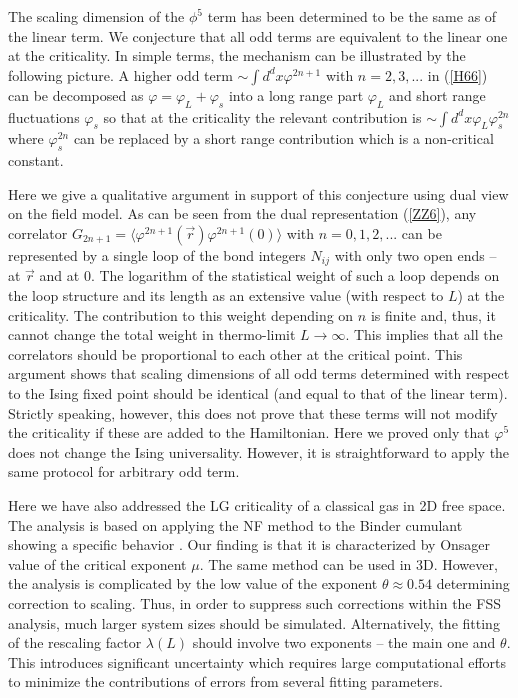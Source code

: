 \documentclass[prb,aps,twocolumn,groupedaddress,floats,showpacs,final]{revtex4}
\begin{document}
 The scaling dimension of the $\phi^5$ term has been determined to be the same as of the linear term. We  
 conjecture that all odd terms are equivalent to the linear one at the criticality.   In simple terms, the mechanism can be illustrated by the following picture. A higher odd term $\sim \int d^dx \varphi^{2n+1}$ with $n=2,3,...$ in (\ref{H66}) can be decomposed as $\varphi=\varphi_L + \varphi_s$  into a long range part $\varphi_L$ and short range fluctuations $\varphi_s$ so that at the criticality the relevant contribution is $\sim \int d^dx \varphi_L \varphi_s^{2n}$ where     $\varphi_s^{2n}$ can be replaced by a short range contribution which is a non-critical constant.  

Here we give a qualitative argument in support of this conjecture using dual view on the field model. As can be seen from the dual representation (\ref{ZZ6}), any correlator $G_{2n+1}=\langle \varphi^{2n+1}(\vec{r}) \varphi^{2n+1}(0) \rangle $ with $n=0,1,2,...$ can be represented by a single loop of the bond integers $N_{ij}$ with only two open ends -- at $\vec{r}$ and at $0$. The logarithm of the statistical weight of such a loop depends on the loop structure and its length as an extensive value (with respect to $L$) at the criticality. The contribution to this weight depending on $n$  is finite and, thus, it cannot change the total weight in thermo-limit $L \to \infty$. This implies that all the correlators should be proportional to each other at the critical point. This argument shows that scaling dimensions of all odd terms determined with respect to the Ising fixed point should be identical (and equal to that of the linear term). Strictly speaking, however, this does not prove that these terms will not modify the criticality if these are added to the Hamiltonian.   
Here we proved only that $\varphi^5$ does not change the Ising universality. However, it is straightforward to apply the same
protocol for arbitrary odd term.   


Here we have also addressed the LG criticality of a classical gas  in 2D free space. The analysis is based on applying the NF  method to the Binder cumulant showing a specific behavior \cite{Fisher_2003_2}. Our finding is that it is characterized by Onsager value of the critical exponent $\mu$. The same method can be used in 3D. However, the analysis is complicated by the low value of the exponent $\theta \approx 0.54$  determining correction to scaling. Thus, in order to suppress such corrections within the FSS analysis, much larger system sizes should be simulated. Alternatively, the fitting of the rescaling factor $\lambda (L)$ should involve two exponents -- the main one and $\theta$. This introduces significant uncertainty which requires  large computational efforts to minimize the contributions of errors from several fitting parameters.
\end{document}
